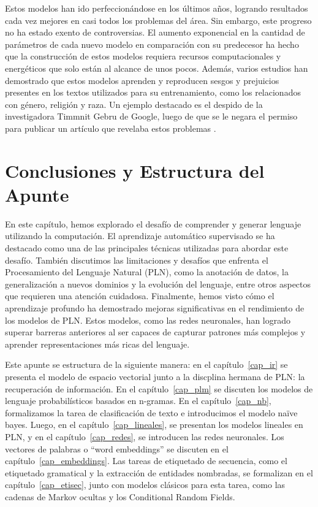 Estos modelos han ido perfeccionándose en los últimos años, logrando resultados cada vez mejores en casi todos los problemas del área. Sin embargo, este progreso no ha estado exento de controversias. El aumento exponencial en la cantidad de parámetros de cada nuevo modelo en comparación con su predecesor ha hecho que la construcción de estos modelos requiera recursos computacionales y energéticos que solo están al alcance de unos pocos. Además, varios estudios han demostrado que estos modelos aprenden y reproducen sesgos y prejuicios presentes en los textos utilizados para su entrenamiento, como los relacionados con género, religión y raza. Un ejemplo destacado es el despido de la investigadora Timmnit Gebru de Google, luego de que se le negara el permiso para publicar un artículo que revelaba estos problemas \cite{bender2021dangers}.



\section{Conclusiones y Estructura del Apunte}
En este capítulo, hemos explorado el desafío de comprender y generar lenguaje utilizando la computación. El aprendizaje automático supervisado se ha destacado como una de las principales técnicas utilizadas para abordar este desafío. También discutimos las limitaciones y desafíos que enfrenta el Procesamiento del Lenguaje Natural (PLN), como la anotación de datos, la generalización a nuevos dominios y la evolución del lenguaje, entre otros aspectos que requieren una atención cuidadosa. Finalmente, hemos visto cómo el aprendizaje profundo ha demostrado mejoras significativas en el rendimiento de los modelos de PLN. Estos modelos, como las redes neuronales, han logrado superar barreras anteriores al ser capaces de capturar patrones más complejos y aprender representaciones más ricas del lenguaje.

Este apunte se estructura de la siguiente manera: en el capítulo~\ref{cap_ir} se presenta el modelo de espacio vectorial junto a la discplina hermana de PLN: la recuperación de información. En el capítulo~\ref{cap_plm} se discuten los modelos de lenguaje probabilísticos basados en n-gramas. En el capítulo~\ref{cap_nb}, formalizamos la tarea de clasificación de texto e introducimos el modelo naïve bayes. Luego, en el capítulo~\ref{cap_lineales}, se presentan los modelos lineales en PLN, y en el capítulo~\ref{cap_redes}, se introducen las redes neuronales. Los vectores de palabras o ``word embeddings'' se discuten en el capítulo~\ref{cap_embeddings}. Las tareas de etiquetado de secuencia, como el etiquetado gramatical y la extracción de entidades nombradas, se formalizan en el capítulo~\ref{cap_etisec}, junto con modelos clásicos para esta tarea, como las cadenas de Markov ocultas y los Conditional Random Fields.

